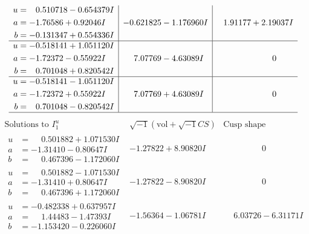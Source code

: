 \documentclass[1p]{elsarticle_modified}
\theoremstyle{definition}
\newcommand{\I}{\sqrt{-1}}
\begin{document}
$$\begin{array}{c|c|c}
\begin{aligned}
u &= \phantom{-}0.510718 - 0.654379 I \\
a &= -1.76586 + 0.92046 I \\
b &= -0.131347 + 0.554336 I\end{aligned}
 & -0.621825 - 1.176960 I & \phantom{-}1.91177 + 2.19037 I \\ \hline\begin{aligned}
u &= -0.518141 + 1.051120 I \\
a &= -1.72372 - 0.55922 I \\
b &= \phantom{-}0.701048 + 0.820542 I\end{aligned}
 & \phantom{-}7.07769 - 4.63089 I & \phantom{-0.000000 } 0 \\ \hline\begin{aligned}
u &= -0.518141 - 1.051120 I \\
a &= -1.72372 + 0.55922 I \\
b &= \phantom{-}0.701048 - 0.820542 I\end{aligned}
 & \phantom{-}7.07769 + 4.63089 I & \phantom{-0.000000 } 0\\
 \hline 
 \end{array}$$\newpage$$\begin{array}{c|c|c}  
\text{Solutions to }I^u_{1}& \I (\text{vol} + \sqrt{-1}CS) & \text{Cusp shape}\\
 \hline 
\begin{aligned}
u &= \phantom{-}0.501882 + 1.071530 I \\
a &= -1.31410 - 0.80647 I \\
b &= \phantom{-}0.467396 - 1.172060 I\end{aligned}
 & -1.27822 + 8.90820 I & \phantom{-0.000000 } 0 \\ \hline\begin{aligned}
u &= \phantom{-}0.501882 - 1.071530 I \\
a &= -1.31410 + 0.80647 I \\
b &= \phantom{-}0.467396 + 1.172060 I\end{aligned}
 & -1.27822 - 8.90820 I & \phantom{-0.000000 } 0 \\ \hline\begin{aligned}
u &= -0.482338 + 0.637957 I \\
a &= \phantom{-}1.44483 - 1.47393 I \\
b &= -1.153420 - 0.226060 I\end{aligned}
 & -1.56364 - 1.06781 I & \phantom{-}6.03726 - 6.31171 I \\ \hline\begin{aligned}

\end{aligned}
\end{array}$$
\end{document}
